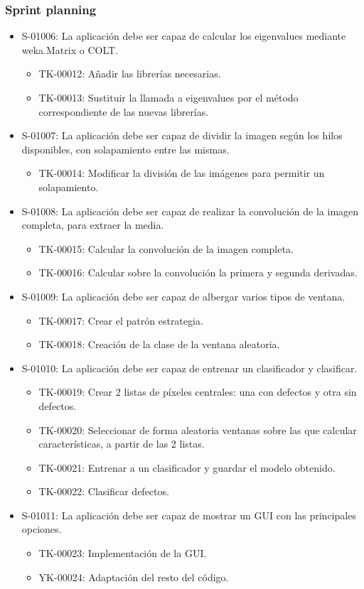 \subsubsection*{Sprint planning}
\begin{itemize}
 \item S-01006: La aplicación debe ser capaz de calcular los eigenvalues mediante weka.Matrix o COLT.
 \begin{itemize}
  \item TK-00012: Añadir las librerías necesarias.
  \item TK-00013: Sustituir la llamada a eigenvalues por el método correspondiente de las nuevas librerías.
 \end{itemize}
 \item S-01007: La aplicación debe ser capaz de dividir la imagen según los hilos disponibles, con solapamiento entre las mismas.
 \begin{itemize}
  \item TK-00014: Modificar la división de las imágenes para permitir un solapamiento.
 \end{itemize}
 \item S-01008: La aplicación debe ser capaz de realizar la convolución de la imagen completa, para extraer la media.
 \begin{itemize}
  \item TK-00015: Calcular la convolución de la imagen completa.
  \item TK-00016: Calcular sobre la convolución la primera y segunda derivadas.
 \end{itemize}
 \item S-01009: La aplicación debe ser capaz de albergar varios tipos de ventana.
 \begin{itemize}
  \item TK-00017: Crear el patrón estrategia.
  \item TK-00018: Creación de la clase de la ventana aleatoria.
 \end{itemize}
 \item S-01010: La aplicación debe ser capaz de entrenar un clasificador y clasificar.
 \begin{itemize}
  \item TK-00019: Crear 2 listas de píxeles centrales: una con defectos y otra sin defectos.
  \item TK-00020: Seleccionar de forma aleatoria ventanas sobre las que calcular características, a partir de las 2 listas.
  \item TK-00021: Entrenar a un clasificador y guardar el modelo obtenido.
  \item TK-00022: Clasificar defectos.
 \end{itemize}
 \item S-01011: La aplicación debe ser capaz de mostrar un GUI con las principales opciones.
 \begin{itemize}
  \item TK-00023: Implementación de la GUI.
  \item YK-00024: Adaptación del resto del código.
 \end{itemize}
\end{itemize}

